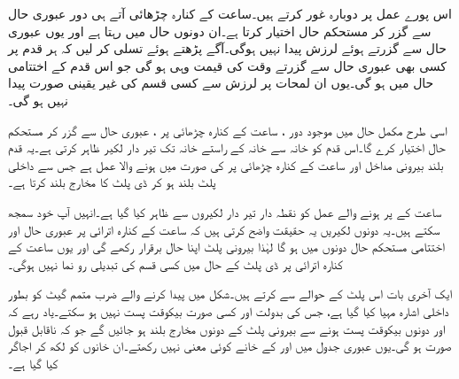 اس پورے عمل پر دوبارہ غور کرتے ہیں۔ساعت کے کنارہ چڑھائی آتے ہی دور عبوری حال  سے گزر کر مستحکم حال  اختیار کرتا ہے۔ان دونوں حال میں  رہتا ہے اور یوں عبوری حال سے گزرتے ہوئے لرزش پیدا نہیں ہوگی۔آگے پڑھتے ہوئے تسلی کر لیں کہ ہر قدم پر کسی بھی عبوری حال سے گزرتے وقت  کی قیمت وہی ہو گی جو اس قدم کے اختتامی حال میں ہو گی۔یوں ان لمحات پر لرزش سے کسی قسم کی غیر یقینی صورت پیدا نہیں ہو گی۔

اسی طرح مکمل حال  میں موجود دور ، ساعت کے کنارہ چڑھائی پر ، عبوری حال  سے گزر کر مستحکم حال  اختیار کرے گا۔اس قدم کو خانہ  سے خانہ  کے راستے خانہ  تک تیر دار لکیر ظاہر کرتی ہے۔یہ قدم بلند بیرونی مداخل  اور ساعت کے کنارہ چڑھائی پر  کی صورت میں ہونے والا عمل ہے جس سے داخلی پلٹ بلند ہو کر ڈی پلٹ کا مخارج بلند  کرتا ہے۔

ساعت کے  پر ہونے والے عمل کو نقطہ دار تیر دار لکیروں سے ظاہر کیا گیا ہے۔انہیں آپ خود سمجھ سکتے ہیں۔یہ دونوں لکیریں یہ حقیقت واضح کرتی ہیں کہ ساعت کے کنارہ اترائی پر عبوری حال اور اختتامی مستحکم حال دونوں میں  ہو گا لہٰذا بیرونی پلٹ اپنا حال برقرار رکھے گی اور یوں ساعت کے کنارہ اترائی پر ڈی پلٹ کے حال میں کسی قسم کی تبدیلی رو نما نہیں ہوگی۔

ایک آخری بات اس پلٹ کے حوالے سے کرتے ہیں۔شکل  میں  پیدا کرنے والے ضرب متمم گیٹ کو  بطور داخلی اشارہ مہیا کیا گیا ہے، جس کی بدولت  اور  کسی صورت بیکوقت پست نہیں ہو سکتے۔یاد رہے کہ  اور  دونوں بیکوقت پست ہونے سے بیرونی پلٹ کے دونوں مخارج بلند ہو جائیں گے جو کہ ناقابل قبول صورت ہو گی۔یوں عبوری جدول میں  اور  کے خانے کوئی معنی نہیں رکھتے۔ان خانوں کو  لکھ کر اجاگر کیا گیا ہے۔

